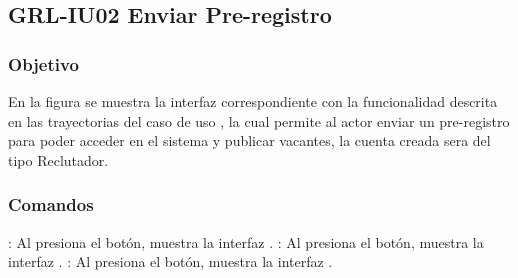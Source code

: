 \clearpage
\subsection{GRL-IU02 Enviar Pre-registro}

\subsubsection{Objetivo}
En la figura  se muestra la interfaz correspondiente con la funcionalidad descrita en las
trayectorias del caso de uso  , la cual permite al actor enviar un pre-registro para poder acceder 
en el sistema y publicar vacantes, la cuenta creada sera del tipo Reclutador.

\subsubsection{Comandos}


\Titem {} : Al presiona el botón, muestra la interfaz .
\Titem {} : Al presiona el botón, muestra la interfaz .
\Titem {} : Al presiona el botón, muestra la interfaz .



\clearpage
